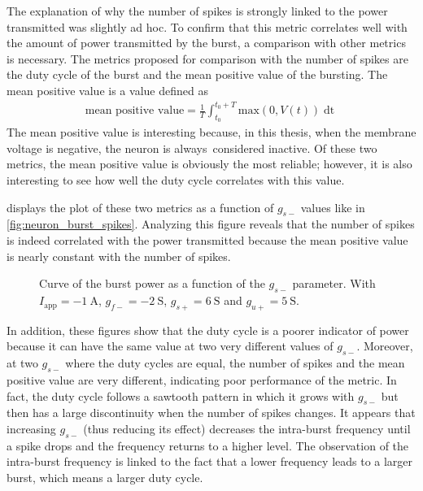 The explanation of why the number of spikes is strongly linked to the power transmitted was slightly ad hoc.
To confirm that this metric correlates well with the amount of power transmitted by the burst, a comparison with other metrics is necessary.
The metrics proposed for comparison with the number of spikes are the duty cycle of the burst and the mean positive value of the bursting.
The mean positive value is a value defined as
\begin{align}
    \text{mean positive value} = \frac{1}{T}\int_{t_0}^{t_0+T} \text{max}\left(0, V(t)\right) \mathop{\mathrm{d}t} 
\end{align}
The mean positive value is interesting because, in this thesis, when the membrane voltage is negative, the neuron is always considered inactive.
Of these two metrics, the mean positive value is obviously the most reliable; however, it is also interesting to see how well the duty cycle correlates with this value.

 displays the plot of these two metrics as a function of $g_{s-}$ values like in \cref{fig:neuron_burst_spikes}.
Analyzing this figure reveals that the number of spikes is indeed correlated with the power transmitted because the mean positive value is nearly constant with the number of spikes.

\begin{figure}[!htb]
    \centering
    \caption{Curve of the burst power as a function of the $g_{s-}$ parameter. With $I_\text{app} = \qty{-1}{\ampere}$, $g_{f-} = \qty{-2}{\siemens}$, $g_{s+} = \qty{6}{\siemens}$ and $g_{u+} = \qty{5}{\siemens}$.}
    \label{fig:neuron_burst_power}
\end{figure}

In addition, these figures show that the duty cycle is a poorer indicator of power because it can have the same value at two very different values of $g_{s-}$.
Moreover, at two $g_{s-}$ where the duty cycles are equal, the number of spikes and the mean positive value are very different, indicating poor performance of the metric.
In fact, the duty cycle follows a sawtooth pattern in which it grows with $g_{s-}$ but then has a large discontinuity when the number of spikes changes.
It appears that increasing $g_{s-}$ (thus reducing its effect) decreases the intra-burst frequency until a spike drops and the frequency returns to a higher level.
The observation of the intra-burst frequency is linked to the fact that a lower frequency leads to a larger burst, which means a larger duty cycle.

